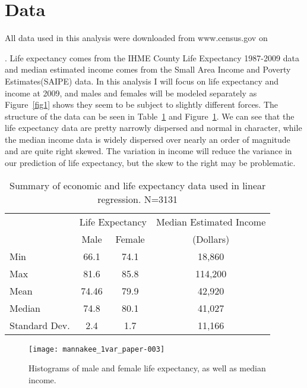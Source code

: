 \documentclass[12pt]{article}
\begin{document}
\section*{Data}
All data used in this analysis were downloaded from www.census.gov on \date{September 2, 2012}. Life expectancy comes from the IHME County Life Expectancy 1987-2009 data and median estimated income comes from the Small Area Income and Poverty Estimates(SAIPE) data. In this analysis I will focus on life expectancy and income at 2009, and males and females will be modeled separately as Figure~\ref{fig1} shows they seem to be subject to slightly different forces. The structure of the data can be seen in Table~\ref{datasummary} and Figure~\ref{hist}. We can see that the life expectancy data are pretty narrowly dispersed and normal in character, while the median income data is widely dispersed over nearly an order of magnitude and are quite right skewed. The variation in income will reduce the variance in our prediction of life expectancy, but the skew to the right may be problematic.
\begin{table}[h]
      \centering
      \begin{tabular}{lccc}\hline
        & \multicolumn{2}{c}{Life Expectancy} & Median Estimated Income\\ 
        & Male & Female & (Dollars) \\ \hline\hline
      Min             & 66.1 & 74.1 & 18,860 \\
      Max             & 81.6 & 85.8 & 114,200 \\
      Mean            & 74.46 & 79.9 & 42,920 \\
      Median          & 74.8 & 80.1 & 41,027 \\
      Standard Dev.   & 2.4 & 1.7 & 11,166 \\ \hline
      \end{tabular}
      \caption{Summary of economic and life expectancy data used in linear regression. N=3131}
      \label{datasummary}
    \end{table}
\begin{figure}[h]
      \begin{center}
\texttt{[image: mannakee\_1var\_paper-003]}
      \end{center}
      \caption{Histograms of male and female life expectancy, as well as median income.}
      \label{hist}
\end{figure}
\newpage
\end{document}
